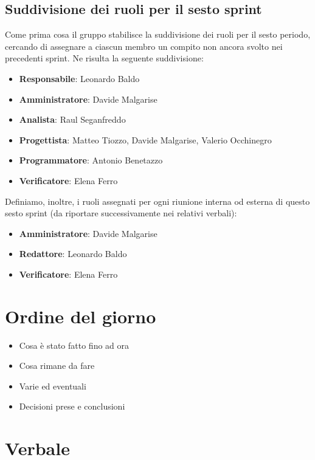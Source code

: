 \documentclass[italian,12pt]{article}
\begin{document}
\subsection{Suddivisione dei ruoli per il sesto sprint}
Come prima cosa il gruppo stabilisce la suddivisione dei ruoli per il sesto periodo, cercando di assegnare a ciascun membro un compito non ancora svolto
nei precedenti sprint. Ne risulta la seguente suddivisione:
\begin{itemize}
	\item \textbf{Responsabile}: Leonardo Baldo
	\item \textbf{Amministratore}: Davide Malgarise
	\item \textbf{Analista}: Raul Seganfreddo
	\item \textbf{Progettista}: Matteo Tiozzo, Davide Malgarise, Valerio Occhinegro
	\item \textbf{Programmatore}: Antonio Benetazzo
	\item \textbf{Verificatore}: Elena Ferro
\end{itemize}
Definiamo, inoltre, i ruoli assegnati per ogni riunione interna od esterna 
di questo sesto sprint (da riportare successivamente nei relativi verbali):
\begin{itemize}
	\item \textbf{Amministratore}: Davide Malgarise
	\item \textbf{Redattore}: Leonardo Baldo
	\item \textbf{Verificatore}: Elena Ferro
\end{itemize}

\section{Ordine del giorno}
\begin{itemize}
	\item Cosa è stato fatto fino ad ora
	\item Cosa rimane da fare
	\item Varie ed eventuali
	\item Decisioni prese e conclusioni
\end{itemize}

\newpage

\section{Verbale}
\end{document}
